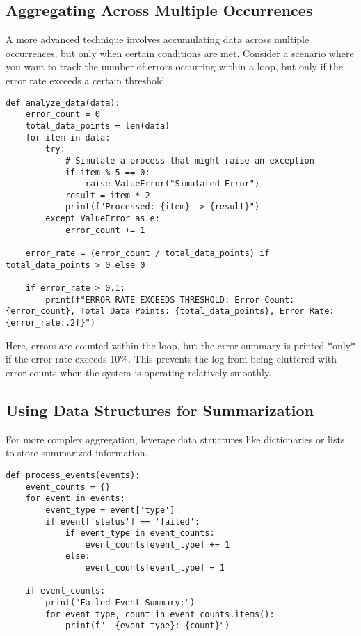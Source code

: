 \documentclass{article}
\begin{document}
{{{\subsection*{Aggregating Across Multiple Occurrences}

A more advanced technique involves accumulating data across multiple occurrences, but only when certain conditions are met. Consider a scenario where you want to track the number of errors occurring within a loop, but only if the error rate exceeds a certain threshold.

\begin{verbatim}
def analyze_data(data):
    error_count = 0
    total_data_points = len(data)
    for item in data:
        try:
            # Simulate a process that might raise an exception
            if item % 5 == 0:
                raise ValueError("Simulated Error")
            result = item * 2
            print(f"Processed: {item} -> {result}")
        except ValueError as e:
            error_count += 1

    error_rate = (error_count / total_data_points) if total_data_points > 0 else 0

    if error_rate > 0.1:
        print(f"ERROR RATE EXCEEDS THRESHOLD: Error Count: {error_count}, Total Data Points: {total_data_points}, Error Rate: {error_rate:.2f}")
\end{verbatim}

Here, errors are counted within the loop, but the error summary is printed *only* if the error rate exceeds 10\%. This prevents the log from being cluttered with error counts when the system is operating relatively smoothly.

\subsection*{Using Data Structures for Summarization}

For more complex aggregation, leverage data structures like dictionaries or lists to store summarized information.

\begin{verbatim}
def process_events(events):
    event_counts = {}
    for event in events:
        event_type = event['type']
        if event['status'] == 'failed':
            if event_type in event_counts:
                event_counts[event_type] += 1
            else:
                event_counts[event_type] = 1

    if event_counts:
        print("Failed Event Summary:")
        for event_type, count in event_counts.items():
            print(f"  {event_type}: {count}")
\end{verbatim}

}}}
\end{document}
